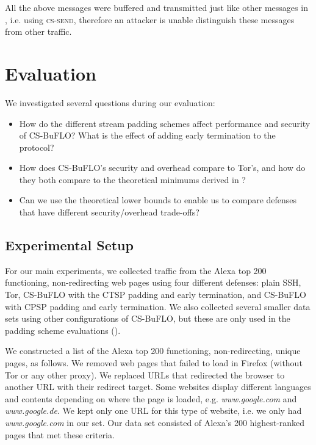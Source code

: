 \documentclass[10pt,journal]{IEEEtran}
\newcommand{\csb} {CS-BuFLO\xspace}
\begin{document}
All the above messages were buffered and transmitted just like other 
messages in , i.e. using \textsc{cs-send}, 
therefore an attacker is unable distinguish these messages from 
other traffic.




\section{Evaluation}
\label{sec:evaluation}


We investigated several questions during our evaluation:
\begin{itemize}
\item How do the different stream padding schemes affect performance
    and security of \csb?  What is the effect of adding early
    termination to the protocol?
  \item How does \csb's security and overhead compare to Tor's, and
    how do they both compare to the theoretical minimums derived in
    ?  
  \item Can we use the theoretical lower bounds to enable us to
    compare defenses that have different security/overhead trade-offs?
\end{itemize}

\subsection{Experimental Setup}
\label{subsec:setup}


For our main experiments, we collected traffic from the Alexa top 200
functioning, non-redirecting web pages using four different defenses:
plain SSH, Tor, \csb with the CTSP padding and early termination, and
\csb with CPSP padding and early termination.  We also collected
several smaller data sets using other configurations of \csb, but
these are only used in the padding scheme evaluations
().

We constructed a list of the Alexa top 200 functioning,
non-redirecting, unique pages, as follows.  We removed web pages that
failed to load in Firefox (without Tor or any other proxy).  We
replaced URLs that redirected the browser to another URL with their
redirect target.  Some websites display different languages and
contents depending on where the page is loaded,
e.g. \textit{www.google.com} and \textit{www.google.de}. We kept only
one URL for this type of website, i.e. we only had
\textit{www.google.com} in our set.  Our data set consisted of Alexa's
200 highest-ranked pages that met these criteria.
\end{document}
